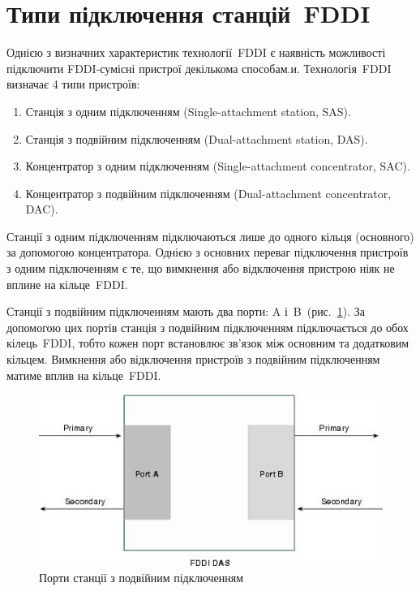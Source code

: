 \documentclass[
	a4paper,
	oneside,
	BCOR = 10mm,
	DIV = 12,
	12pt,
	headings = normal,
]{scrartcl}
\begin{document}
	\section{Типи підключення станцій~\textenglish{FDDI}}
		Однією з визначних характеристик технології~\textenglish{FDDI} є наявність можливості підключити \textenglish{FDDI}-сумісні пристрої декількома способам.и. Технологія~\textenglish{FDDI} визначає 4 типи пристроїв:
		\begin{enumerate}
			\item Станція з одним підключенням (\textenglish{Single-attachment station, SAS}).
			\item Станція з подвійним підключенням (\textenglish{Dual-attachment station, DAS)}.
			\item Концентратор з одним підключенням (\textenglish{Single-attachment concentrator, SAC}).
			\item Концентратор з подвійним підключенням (\textenglish{Dual-attachment concentrator, DAC}).
		\end{enumerate}

		Станції з одним підключенням підключаються лише до одного кільця (основного) за допомогою концентратора. Однією з основних переваг підключення пристроїв з одним підключенням є те, що вимкнення або відключення пристрою ніяк не вплине на кільце~\textenglish{FDDI}.

		Станції з подвійним підключенням мають два порти: A і~B~(рис.~\ref{fig:das-ports}). За допомогою цих портів станція з подвійним підключенням підключається до обох кілець~\textenglish{FDDI}, тобто кожен порт встановлює зв'язок між основним та додатковим кільцем. Вимкнення або відключення пристроїв з подвійним підключенням матиме вплив на кільце~\textenglish{FDDI}.

		\begin{figure}[!htbp]
			\centering
			\includegraphics[height = 10\baselineskip]{./assets/y03s01-telecom-homework-01-p04-das-ports.jpg}
			\caption{Порти станції з подвійним підключенням}
			\label{fig:das-ports}
		\end{figure}
\end{document}
